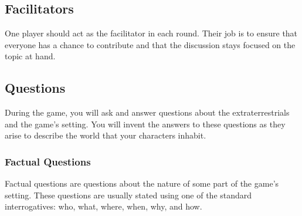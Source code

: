 \documentclass[a6paper, 11pt, parskip=half, DIV=15]{scrartcl}
\begin{document}
\subsection*{Facilitators}
One player should act as the facilitator in each round. Their job is to ensure that everyone has a chance to contribute and that the discussion stays focused on the topic at hand.%

\subsection*{Questions}
During the game, you will ask and answer questions about the extraterrestrials and the game's setting.
You will invent the answers to these questions as they arise to describe the world that your characters inhabit.

\newpage
\enlargethispage{1.75\baselineskip}


\subsubsection*{Factual Questions}

Factual questions are questions about the nature of some part of the game's setting.
These questions are usually stated using one of the standard interrogatives: who, what, where, when, why, and how.

\vfill

\begin{center}
\end{center}
\end{document}
